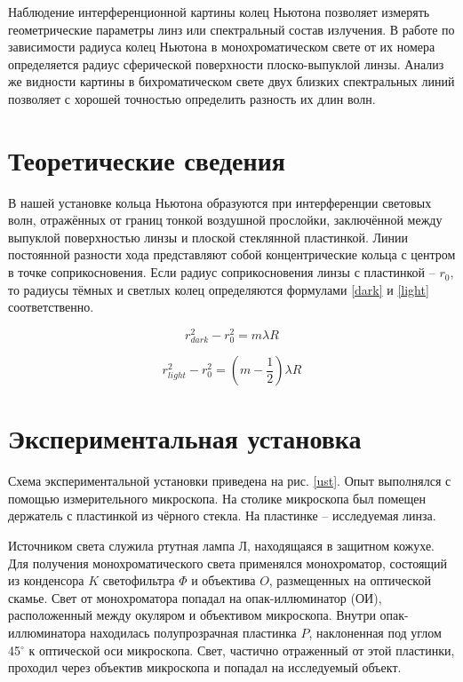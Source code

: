 \documentclass[a4paper,12pt]{article} %
\begin{document}

\begin{center}
Наблюдение интерференционной картины колец Ньютона позволяет измерять геометрические параметры линз или спектральный состав излучения. В работе по зависимости радиуса колец Ньютона в монохроматическом свете от их номера определяется радиус сферической поверхности плоско-выпуклой линзы. Анализ же видности картины в бихроматическом свете двух близких спектральных линий позволяет с хорошей точностью определить разность их длин волн.
\end{center}

\tableofcontents

\newpage
\section{Теоретические сведения}

В нашей установке кольца Ньютона образуются при интерференции световых волн, отражённых от границ тонкой воздушной прослойки, заключённой между выпуклой поверхностью линзы и плоской стеклянной пластинкой.
Линии постоянной разности хода представляют собой концентрические кольца с центром в точке соприкосновения. 
Если радиус соприкосновения линзы с пластинкой -- $r_0$, то радиусы тёмных и светлых колец определяются формулами \eqref{dark} и \eqref{light} соответственно.

\begin{equation}
    r_{dark}^2 - r_0^2 = m\lambda R
    \label{dark}
\end{equation}

\begin{equation}
    r_{light}^2-r_0^2 = (m - \frac{1}{2})\lambda R
    \label{light}
\end{equation}

\section{Экспериментальная установка}
Схема экспериментальной установки приведена на рис. \ref{ust}. Опыт выполнялся с помощью измерительного микроскопа. На столике микроскопа был помещен держатель с пластинкой из чёрного стекла. На пластинке -- исследуемая линза.

Источником света служила ртутная лампа Л, находящаяся в защитном кожухе. Для получения монохроматического света применялся монохроматор, состоящий из конденсора $K$ светофильтра $\Phi$ и объектива $O$, размещенных на оптической скамье. Свет от монохроматора попадал на опак-иллюминатор (ОИ), расположенный между окуляром и объективом микроскопа. Внутри опак-иллюминатора находилась полупрозрачная пластинка $P$, наклоненная под углом 45$^\circ$ к оптической оси микроскопа. Свет, частично отраженный от этой пластинки, проходил через объектив микроскопа и попадал на исследуемый объект.
\end{document}
